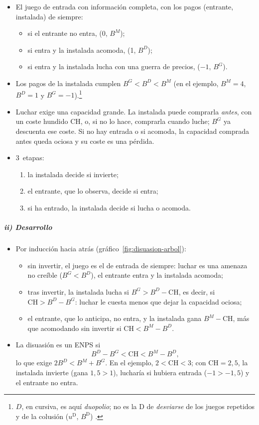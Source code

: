 \documentclass[11pt]{article}
\begin{document}
\begin{itemize}
\item El juego de entrada con información completa, con los pagos (entrante, instalada) de siempre:
  \begin{itemize}
  \item si el entrante no entra, (0, $B^{M}$);
  \item si entra y la instalada acomoda, (1, $B^{D}$);
  \item si entra y la instalada lucha con una guerra de precios, ($-1$, $B^{G}$).
  \end{itemize}
\item Los pagos de la instalada cumplen $B^{G}<B^{D}<B^{M}$ (en el ejemplo, $B^{M}=4$, $B^{D}=1$ y $B^{G}=-1$).\footnote{$D$, en cursiva, es aquí \emph{duopolio}; no es la $\mathrm{D}$ de \emph{desviarse} de los juegos repetidos y de la colusión ($u^{\mathrm{D}}$, $B^{\mathrm{D}}$)  .}
\item Luchar exige una capacidad grande. La instalada puede comprarla \emph{antes}, con un coste hundido $\mathrm{CH}$, o, si no lo hace, comprarla cuando luche; $B^{G}$ ya descuenta ese coste. Si no hay entrada o si acomoda, la capacidad comprada antes queda ociosa y su coste es una pérdida.
\item 3~etapas:
  \begin{enumerate}
  \item la instalada decide si invierte;
  \item el entrante, que lo observa, decide si entra;
  \item si ha entrado, la instalada decide si lucha o acomoda.
  \end{enumerate}
\end{itemize}

\subparagraph{ii) Desarrollo}

\begin{itemize}
\item Por inducción hacia atrás (gráfico~\ref{fig:disuasion-arbol}):
  \begin{itemize}
  \item sin invertir, el juego es el de entrada de siempre: luchar es una amenaza no creíble ($B^{G}<B^{D}$), el entrante entra y la instalada acomoda;
  \item tras invertir, la instalada lucha si $B^{G}>B^{D}-\mathrm{CH}$, es decir, si $\mathrm{CH}>B^{D}-B^{G}$: luchar le cuesta menos que dejar la capacidad ociosa;
  \item el entrante, que lo anticipa, no entra, y la instalada gana $B^{M}-\mathrm{CH}$, más que acomodando sin invertir si $\mathrm{CH}<B^{M}-B^{D}$.
  \end{itemize}
\item La disuasión es un ENPS si
  \[
  B^{D}-B^{G}<\mathrm{CH}<B^{M}-B^{D},
  \]
  lo que exige $2B^{D}<B^{M}+B^{G}$. En el ejemplo, $2<\mathrm{CH}<3$; con $\mathrm{CH}=2{,}5$, la instalada invierte (gana $1{,}5>1$), lucharía si hubiera entrada ($-1>-1{,}5$) y el entrante no entra.
\end{itemize}
\end{document}
